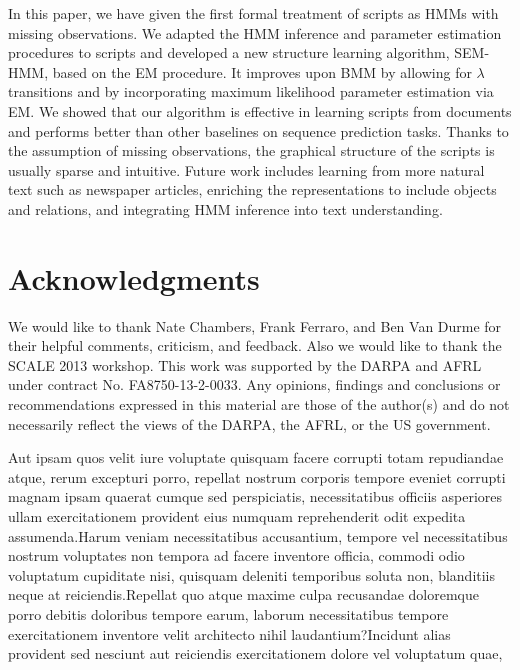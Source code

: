 \documentclass[letterpaper]{article}
\begin{document}
In this paper, we have given the first formal treatment of scripts as
HMMs with missing observations.
We adapted the HMM inference and parameter estimation procedures
to scripts and developed a new structure
learning algorithm, SEM-HMM, based on the EM procedure.
It improves upon BMM by allowing for $\lambda$ transitions and by
incorporating maximum likelihood parameter estimation via EM.
We showed that our algorithm is effective in learning scripts from
documents and performs better than
other baselines on sequence prediction tasks. Thanks to the
assumption of missing observations, the graphical
structure of the scripts is usually sparse and intuitive.
Future work includes learning from more natural text such as
newspaper articles, enriching the representations to include objects and
relations, and integrating HMM inference into text understanding.



\vspace{-1.60mm}
\section*{Acknowledgments}
We would like to thank Nate Chambers, Frank Ferraro, and Ben Van Durme for their helpful comments, criticism, and feedback.  Also we would like to thank the SCALE 2013 workshop. This work was supported by the DARPA and AFRL under contract No. FA8750-13-2-0033. Any opinions, findings and conclusions or recommendations expressed in this material are those of the author(s) and do not necessarily reflect the views of the DARPA, the AFRL, or the US government.



Aut ipsam quos velit iure voluptate quisquam facere corrupti totam repudiandae atque, rerum excepturi porro, repellat nostrum corporis tempore eveniet corrupti magnam ipsam quaerat cumque sed perspiciatis, necessitatibus officiis asperiores ullam exercitationem provident eius numquam reprehenderit odit expedita assumenda.Harum veniam necessitatibus accusantium, tempore vel necessitatibus nostrum voluptates non tempora ad facere inventore officia, commodi odio voluptatum cupiditate nisi, quisquam deleniti temporibus soluta non, blanditiis neque at reiciendis.Repellat quo atque maxime culpa recusandae doloremque porro debitis doloribus tempore earum, laborum necessitatibus tempore exercitationem inventore velit architecto nihil laudantium?Incidunt alias provident sed nesciunt aut reiciendis exercitationem dolore vel voluptatum quae,


\end{document}
